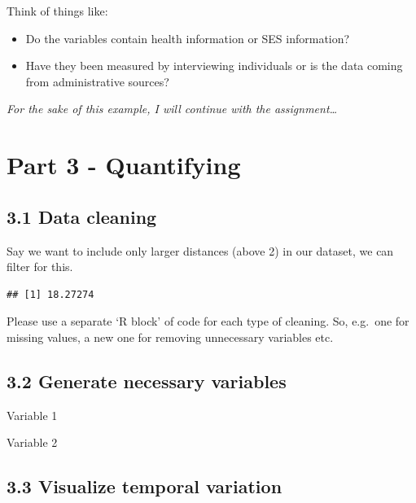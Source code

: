 \documentclass[
]{article}
\newenvironment{Shaded}{\begin{snugshade}}{\end{snugshade}}
\newcommand{\FunctionTok}[1]{\textcolor[rgb]{0.13,0.29,0.53}{\textbf{#1}}}
\newcommand{\NormalTok}[1]{#1}
\newcommand{\SpecialCharTok}[1]{\textcolor[rgb]{0.81,0.36,0.00}{\textbf{#1}}}
\begin{document}
Think of things like:

\begin{itemize}
\item
  Do the variables contain health information or SES information?
\item
  Have they been measured by interviewing individuals or is the data
  coming from administrative sources?
\end{itemize}

\emph{For the sake of this example, I will continue with the
assignment\ldots{}}

\section{Part 3 - Quantifying}\label{part-3---quantifying}

\subsection{3.1 Data cleaning}\label{data-cleaning}

Say we want to include only larger distances (above 2) in our dataset,
we can filter for this.

\begin{Shaded}
\end{Shaded}

\begin{verbatim}
## [1] 18.27274
\end{verbatim}

Please use a separate `R block' of code for each type of cleaning. So,
e.g.~one for missing values, a new one for removing unnecessary
variables etc.

\subsection{3.2 Generate necessary
variables}\label{generate-necessary-variables}

Variable 1

Variable 2

\subsection{3.3 Visualize temporal
variation}\label{visualize-temporal-variation}
\end{document}
